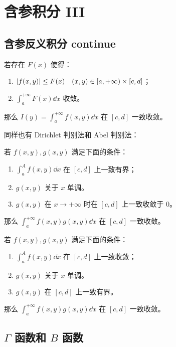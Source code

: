 \section{含参积分 III}

\subsection{含参反义积分 continue}

\begin{theorem}
	若存在 $F(x)$ 使得：
	\begin{enumerate}
		\item $\abs{f(x, y)} \le F(x) \quad (x, y) \in [a, +\infty) \times [c, d]$；
		\item $\displaystyle \int_{a}^{+\infty} F(x) \dd{x}$ 收敛。
	\end{enumerate}
	那么 $\displaystyle I(y) = \int_{a}^{+\infty} f(x, y) \dd{x}$ 在 $[c, d]$ 一致收敛。
\end{theorem}

同样也有 Dirichlet 判别法和 Abel 判别法：

\begin{theorem}
	若 $f(x, y), g(x, y)$ 满足下面的条件：
	\begin{enumerate}
		\item $\displaystyle \int_{a}^{A} f(x, y) \dd{x}$ 在 $[c, d]$ 上一致有界；
		\item $g(x, y)$ 关于 $x$ 单调。
		\item $g(x, y)$ 在 $x \to +\infty$ 时在 $[c, d]$ 上一致收敛于 $0$。
	\end{enumerate}
	那么 $\displaystyle \int_{a}^{+\infty} f(x, y) g(x, y) \dd{x}$ 在 $[c, d]$ 一致收敛。
\end{theorem}

\begin{theorem}
	若 $f(x, y), g(x, y)$ 满足下面的条件：
	\begin{enumerate}
		\item $\displaystyle \int_{a}^{A} f(x, y) \dd{x}$ 在 $[c, d]$ 上一致收敛；
		\item $g(x, y)$ 关于 $x$ 单调。
		\item $g(x, y)$ 在 $[c, d]$ 上一致有界。
	\end{enumerate}
	那么 $\displaystyle \int_{a}^{+\infty} f(x, y) g(x, y) \dd{x}$ 在 $[c, d]$ 一致收敛。
\end{theorem}

\subsection{$\Gamma$ 函数和 $B$ 函数}

